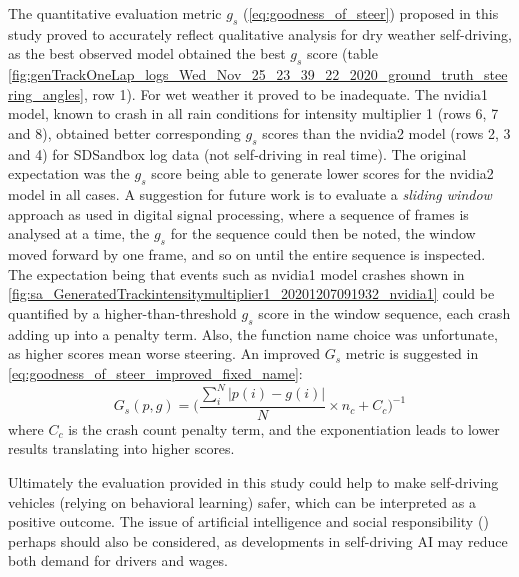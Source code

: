 The quantitative evaluation metric $g_s$ (\ref{eq:goodness_of_steer}) proposed in this study proved to accurately reflect qualitative analysis for dry weather self-driving, as the best observed model obtained the best $g_s$ score (table  \ref{fig:genTrackOneLap_logs_Wed_Nov_25_23_39_22_2020_ground_truth_steering_angles}, row 1). For wet weather it proved to be inadequate. 
The nvidia1 model, known to crash in all rain conditions for intensity multiplier 1 (rows 6, 7 and 8), obtained better corresponding $g_s$ scores than the nvidia2 model (rows 2, 3 and 4) for SDSandbox log data (not self-driving in real time). The original expectation was the $g_s$ score being able to generate lower scores for the nvidia2 model in all cases. A suggestion for future work is to evaluate a \textit{sliding window} approach as used in digital signal processing, where a sequence of frames is analysed at a time, the $g_s$ for the sequence could then be noted, the window moved forward by one frame, and so on until the entire sequence is inspected. The expectation being that events such as nvidia1 model crashes shown in \ref{fig:sa_GeneratedTrackintensitymultiplier1_20201207091932_nvidia1} could be quantified by a higher-than-threshold $g_s$ score in the window sequence, each crash adding up into a penalty term. Also, the function name choice was unfortunate, as higher scores mean worse steering. An improved $G_s$ metric is suggested in \ref{eq:goodness_of_steer_improved_fixed_name}:
\begin{equation}
    \label{eq:goodness_of_steer_improved_fixed_name}
    G_s(p,g) = \Bigg(\frac{\sum_i^N \lvert p(i)-g(i) \rvert }{N} \times n_c + C_c\Bigg)^{-1}
\end{equation}
where $C_c$ is the crash count penalty term, and the exponentiation leads to lower results translating into higher scores.


Ultimately the evaluation provided in this study could help to make self-driving vehicles (relying on behavioral learning) safer, which can be interpreted as a positive outcome. The issue of artificial intelligence and social responsibility (\cite{saveliev2020artificial}) perhaps should also be considered, as developments in self-driving AI may reduce both demand for drivers and wages.

